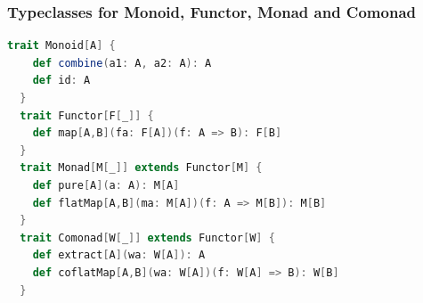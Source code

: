 \documentclass[mathserif,handout]{beamer}
\begin{document}

\begin{frame}[fragile]
  \frametitle{Typeclasses for Monoid, Functor, Monad and Comonad}
  \begin{lstlisting}[language=scala]
  trait Monoid[A] {
    def combine(a1: A, a2: A): A
    def id: A
  }
  trait Functor[F[_]] {
    def map[A,B](fa: F[A])(f: A => B): F[B]
  }
  trait Monad[M[_]] extends Functor[M] {
    def pure[A](a: A): M[A]
    def flatMap[A,B](ma: M[A])(f: A => M[B]): M[B]
  }
  trait Comonad[W[_]] extends Functor[W] {
    def extract[A](wa: W[A]): A
    def coflatMap[A,B](wa: W[A])(f: W[A] => B): W[B] 
  }
\end{lstlisting}
\end{frame}
\end{document}

